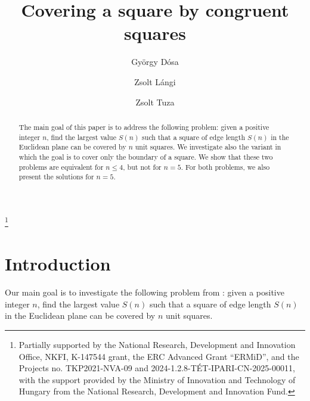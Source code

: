 \documentclass[twoside]{amsart}
\begin{document}
\title[Covering a square]{Covering a square by congruent squares}

\author[G. D\'osa]{Gy\"orgy D\'osa}
\author[Zs. L\'angi]{Zsolt L\'angi}
\author[Zs. Tuza]{Zsolt Tuza}

\address{Gy\"orgy D\'osa, Department of Mathematics, University of Pannonia, Veszpr\'em, Hungary}
\address{Zsolt L\'angi, Bolyai Institute, University of Szeged, Szeged, Hungary, and\\
Alfr\'ed R\'enyi Institute of Mathematics, Budapest, Hungary}
\address{Zsolt Tuza, Department of Mathematics, University of Pannonia, Veszpr\'em, Hungary, and\\
HUN-REN Alfr\'ed R\'enyi Institute of Mathematics, Budapest, Hungary}

\thanks{Partially supported by the National Research, Development and Innovation Office, NKFI, K-147544 grant, the ERC Advanced Grant “ERMiD”, and the Projects no. TKP2021-NVA-09 and 2024-1.2.8-T\'ET-IPARI-CN-2025-00011, with the support provided by the Ministry of Innovation and Technology of Hungary from the National Research, Development and Innovation Fund.}


\begin{abstract}
The main goal of this paper is to address the following problem: given a positive integer $n$, find the largest value $S(n)$ such that a square of edge length $S(n)$ in the Euclidean plane can be covered by $n$ unit squares. We investigate also the variant in which the goal is to cover only the boundary of a square. We show that these two problems are equivalent for $n \leq 4$, but not for $n=5$. For both problems, we also present
the solutions for $n=5$.
\end{abstract}

\maketitle

\section{Introduction}

Our main goal is to investigate the following problem from \cite{Friedcov}: given a positive integer $n$, find the
largest value $S(n)$ such that a square of edge length $S(n)$ in the Euclidean
plane can be covered by $n$ unit squares.
\end{document}
